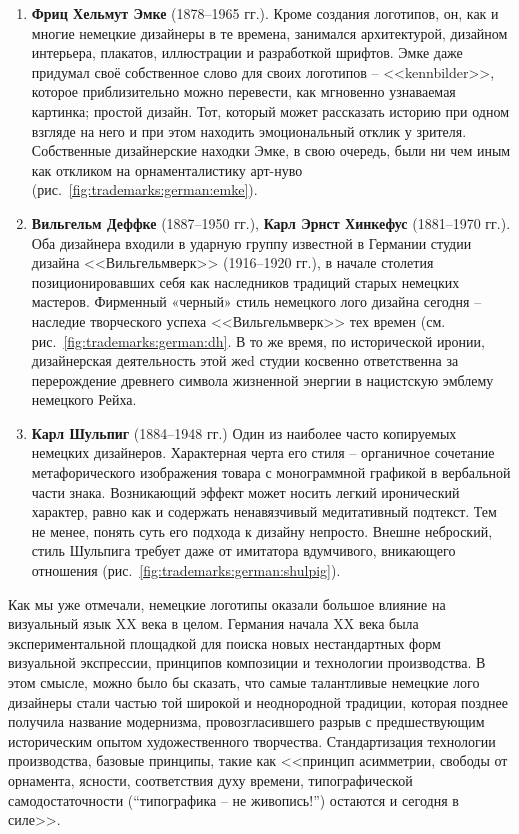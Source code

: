 \begin{enumerate}
\item \textbf{Фриц Хельмут Эмке} (1878--1965 гг.). Кроме создания логотипов, он, как и многие
  немецкие дизайнеры в те времена, занимался архитектурой, дизайном интерьера, плакатов, иллюстрации
  и разработкой шрифтов. Эмке даже придумал своё собственное слово для своих логотипов --
  <<kennbilder>>, которое приблизительно можно перевести, как мгновенно узнаваемая картинка; простой
  дизайн. Тот, который может рассказать историю при одном взгляде на него и при этом находить
  эмоциональный отклик у зрителя. Собственные дизайнерские находки Эмке, в свою очередь, были ни чем
  иным как откликом на орнаменталистику арт-нуво (рис.~\ref{fig:trademarks:german:emke}).
\item \textbf{Вильгельм Деффке} (1887--1950 гг.), \textbf{Карл Эрнст Хинкефус} (1881--1970 гг.). Оба
  дизайнера входили в ударную группу известной в Германии студии дизайна <<Вильгельмверк>> (1916--1920
  гг.), в начале столетия позиционировавших себя как наследников традиций старых немецких
  мастеров. Фирменный «черный» стиль немецкого лого дизайна сегодня -- наследие творческого успеха
  <<Вильгельмверк>> тех времен (см. рис.~\ref{fig:trademarks:german:dh}. В то же время, по
  исторической иронии, дизайнерская деятельность этой жеd студии косвенно ответственна за перерождение
  древнего символа жизненной энергии в нацистскую эмблему немецкого Рейха.
\item \textbf{Карл Шульпиг} (1884--1948 гг.) Один из наиболее часто копируемых немецких
  дизайнеров. Характерная черта его стиля -- органичное сочетание метафорического изображения товара
  с монограммной графикой в вербальной части знака. Возникающий эффект может носить легкий
  иронический характер, равно как и содержать ненавязчивый медитативный подтекст. Тем не менее,
  понять суть его подхода к дизайну непросто. Внешне неброский, стиль Шульпига требует даже от
  имитатора вдумчивого, вникающего отношения (рис.~\ref{fig:trademarks:german:shulpig}).
\end{enumerate}

Как мы уже отмечали, немецкие логотипы оказали большое влияние на визуальный язык XX века в целом. Германия начала XX века была экспериментальной площадкой для поиска новых нестандартных форм визуальной экспрессии,
принципов композиции и технологии производства. В этом смысле, можно было бы сказать, что самые
талантливые немецкие лого дизайнеры стали частью той широкой и неоднородной традиции, которая
позднее получила название модернизма, провозгласившего разрыв с предшествующим историческим опытом
художественного творчества. Стандартизация технологии производства, базовые принципы, такие как
<<принцип асимметрии, свободы от орнамента, ясности, соответствия духу времени, типографической
самодостаточности (``типографика – не живопись!'') остаются и сегодня в силе>>\autocite[][8]{chihold2011}.

